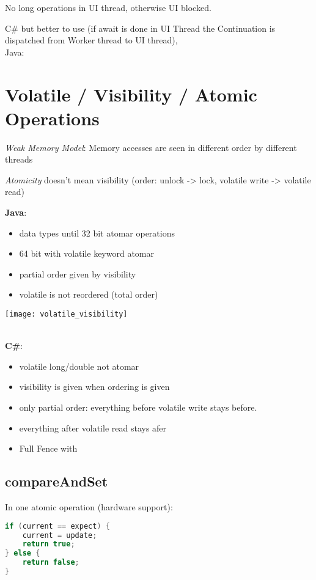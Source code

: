 \begin{multicols*}{4}
No long operations in UI thread, otherwise UI blocked.

C\#  but better to use  (if await is done in UI Thread the Continuation is dispatched from Worker thread to UI thread),\\
Java: 

\section{Volatile / Visibility / Atomic Operations}
	\textit{Weak Memory Model}: Memory accesses are seen in different order by different threads

	\textit{Atomicity} doesn't mean visibility (order: unlock -> lock, volatile write -> volatile read)

    \begin{minipage}[c]{.6\linewidth}
        \textbf{Java}:
        \begin{itemize}
            \item data types until 32 bit atomar operations
            \item 64 bit with volatile keyword atomar
        	\item partial order given by visibility
            \item volatile is not reordered (total order)
        \end{itemize}
    \end{minipage}%
    \begin{minipage}[c]{.1\textwidth}
        \texttt{[image: volatile\_visibility]}
    \end{minipage}%
    \\ %
    \textbf{C\#}:
    \begin{itemize}
        \item volatile long/double not atomar
        \item visibility is given when ordering is given
        \item only partial order: everything before volatile write stays before.
        \item everything after volatile read stays afer
        \item Full Fence with 
    \end{itemize}

    \subsection{compareAndSet}
    In one atomic operation (hardware support):
    \begin{lstlisting}[language=java]
if (current == expect) {
    current = update;
    return true;
} else {
    return false;
}
\end{lstlisting}


\end{multicols*}
